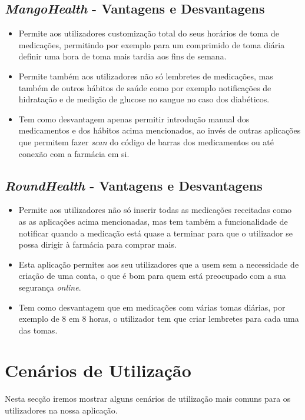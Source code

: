 \documentclass[a4paper]{article}
\begin{document}
\subsection{\textit{MangoHealth} - Vantagens e Desvantagens}

\begin{itemize}
    \item Permite aos utilizadores customização total do seus horários de toma de medicações, permitindo por exemplo para um comprimido de toma diária definir uma hora de toma mais tardia aos fins de semana.
    \item Permite também aos utilizadores não só lembretes de medicações, mas também de outros hábitos de saúde como por exemplo notificações de hidratação e de medição de glucose no sangue no caso dos diabéticos.
    \item Tem como desvantagem apenas permitir introdução manual dos medicamentos e dos hábitos acima mencionados, ao invés de outras aplicações que permitem fazer \textit{scan} do código de barras dos medicamentos ou até conexão com a farmácia em si. 
\end{itemize}

\subsection{\textit{RoundHealth} - Vantagens e Desvantagens}

\begin{itemize}
    \item Permite aos utilizadores não só inserir todas as medicações receitadas como as as aplicações acima mencionadas, mas tem também a funcionalidade de notificar quando a medicação está quase a terminar para que o utilizador se possa dirigir à farmácia para comprar mais.
    \item Esta aplicação permites aos seu utilizadores que a usem sem a necessidade de criação de uma conta, o que é bom para quem está preocupado com a sua segurança \textit{online}.
    \item Tem como desvantagem que em medicações com várias tomas diárias, por exemplo de 8 em 8 horas, o utilizador tem que criar lembretes para cada uma das tomas.
\end{itemize}

\section{Cenários de Utilização}\label{section:use_cases}
Nesta secção iremos mostrar alguns cenários de utilização mais comuns para os utilizadores na nossa aplicação. \cite{usecases}
\end{document}
